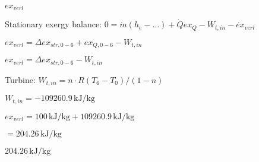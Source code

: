 \( ex_{verl} \)  

Stationary exergy balance:  
\( 0 = \dot{m} \left( h_e - \ldots \right) + \dot{Q} ex_{Q} - W_{t,in} - \dot{ex}_{verl} \)  

\( ex_{verl} = \Delta ex_{str,0-6} + ex_{Q,0-6} - W_{t,in} \)  

\( ex_{verl} = \Delta ex_{str,0-6} - W_{t,in} \)  

Turbine:  
\( W_{t,in} = n \cdot R \left( T_6 - T_0 \right) / (1 - n) \)  

\( W_{t,in} = -109260.9 \, \text{kJ/kg} \)  

\( ex_{verl} = 100 \, \text{kJ/kg} + 109260.9 \, \text{kJ/kg} \)  

\( = 204.26 \, \text{kJ/kg} \)  

\( \underline{204.26 \, \text{kJ/kg}} \)